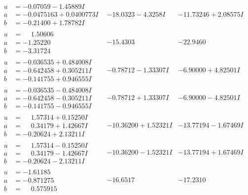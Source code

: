 \documentclass[1p]{elsarticle_modified}
\theoremstyle{definition}
\begin{document}
$$\begin{array}{c|c|c}
\begin{aligned}
u &= -0.07059 - 1.45889 I \\
a &= -0.0475163 + 0.0400773 I \\
b &= -0.21400 + 1.78782 I\end{aligned}
 & -18.0323 - 4.3258 I & -11.73246 + 2.08575 I \\ \hline\begin{aligned}
u &= \phantom{-}1.50606\phantom{ +0.000000I} \\
a &= -1.25220\phantom{ +0.000000I} \\
b &= -3.31724\phantom{ +0.000000I}\end{aligned}
 & -15.4303\phantom{ +0.000000I} & -22.9460\phantom{ +0.000000I} \\ \hline\begin{aligned}
u &= -0.036535 + 0.484008 I \\
a &= -0.642458 + 0.305211 I \\
b &= -0.141755 + 0.946555 I\end{aligned}
 & -0.78712 - 1.33307 I & -6.90000 + 4.82501 I \\ \hline\begin{aligned}
u &= -0.036535 - 0.484008 I \\
a &= -0.642458 - 0.305211 I \\
b &= -0.141755 - 0.946555 I\end{aligned}
 & -0.78712 + 1.33307 I & -6.90000 - 4.82501 I \\ \hline\begin{aligned}
u &= \phantom{-}1.57314 + 0.15250 I \\
a &= \phantom{-}0.34179 + 1.42667 I \\
b &= -0.20624 + 2.13211 I\end{aligned}
 & -10.36200 + 1.52321 I & -13.77194 - 1.67469 I \\ \hline\begin{aligned}
u &= \phantom{-}1.57314 - 0.15250 I \\
a &= \phantom{-}0.34179 - 1.42667 I \\
b &= -0.20624 - 2.13211 I\end{aligned}
 & -10.36200 - 1.52321 I & -13.77194 + 1.67469 I \\ \hline\begin{aligned}
u &= -1.61185\phantom{ +0.000000I} \\
a &= -0.871275\phantom{ +0.000000I} \\
b &= \phantom{-}0.575915\phantom{ +0.000000I}\end{aligned}
 & -16.6517\phantom{ +0.000000I} & -17.2310\phantom{ +0.000000I} \\ \hline\begin{aligned}

\end{aligned}
\end{array}$$
\end{document}
